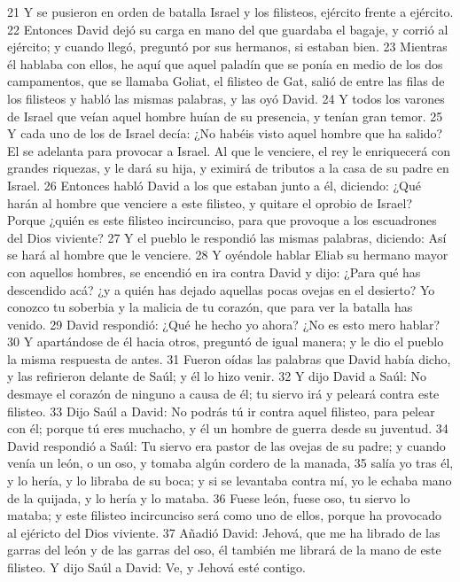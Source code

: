 21 Y se pusieron en orden de batalla Israel y los filisteos, ejército frente a ejército.
22 Entonces David dejó su carga en mano del que guardaba el bagaje, y corrió al ejército; y cuando llegó, preguntó por sus hermanos, si estaban bien.
23 Mientras él hablaba con ellos, he aquí que aquel paladín que se ponía en medio de los dos campamentos, que se llamaba Goliat, el filisteo de Gat, salió de entre las filas de los filisteos y habló las mismas palabras, y las oyó David.
24 Y todos los varones de Israel que veían aquel hombre huían de su presencia, y tenían gran temor.
25 Y cada uno de los de Israel decía: ¿No habéis visto aquel hombre que ha salido? El se adelanta para provocar a Israel. Al que le venciere, el rey le enriquecerá con grandes riquezas, y le dará su hija, y eximirá de tributos a la casa de su padre en Israel.
26 Entonces habló David a los que estaban junto a él, diciendo: ¿Qué harán al hombre que venciere a este filisteo, y quitare el oprobio de Israel? Porque ¿quién es este filisteo incircunciso, para que provoque a los escuadrones del Dios viviente? 
27 Y el pueblo le respondió las mismas palabras, diciendo: Así se hará al hombre que le venciere.
28 Y oyéndole hablar Eliab su hermano mayor con aquellos hombres, se encendió en ira contra David y dijo: ¿Para qué has descendido acá? ¿y a quién has dejado aquellas pocas ovejas en el desierto? Yo conozco tu soberbia y la malicia de tu corazón, que para ver la batalla has venido.
29 David respondió: ¿Qué he hecho yo ahora? ¿No es esto mero hablar?
30 Y apartándose de él hacia otros, preguntó de igual manera; y le dio el pueblo la misma respuesta de antes.
31 Fueron oídas las palabras que David había dicho, y las refirieron delante de Saúl; y él lo hizo venir.
32 Y dijo David a Saúl: No desmaye el corazón de ninguno a causa de él; tu siervo irá y peleará contra este filisteo.
33 Dijo Saúl a David: No podrás tú ir contra aquel filisteo, para pelear con él; porque tú eres muchacho, y él un hombre de guerra desde su juventud.
34 David respondió a Saúl: Tu siervo era pastor de las ovejas de su padre; y cuando venía un león, o un oso, y tomaba algún cordero de la manada,
35 salía yo tras él, y lo hería, y lo libraba de su boca; y si se levantaba contra mí, yo le echaba mano de la quijada, y lo hería y lo mataba.
36 Fuese león, fuese oso, tu siervo lo mataba; y este filisteo incircunciso será como uno de ellos, porque ha provocado al ejéricto del Dios viviente.
37 Añadió David: Jehová, que me ha librado de las garras del león y de las garras del oso, él también me librará de la mano de este filisteo. Y dijo Saúl a David: Ve, y Jehová esté contigo.
